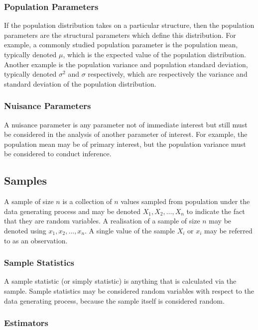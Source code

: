 \documentclass[11pt]{report} %
\begin{document}
\subsubsection{Population Parameters}

If the population distribution takes on a particular structure, then the population parameters are the structural parameters which define this distribution. For example, a commonly studied population parameter is the population mean, typically denoted $\mu$, which is the expected value of the population distribution. Another example is the population variance and population standard deviation, typically denoted $\sigma^{2}$ and $\sigma$ respectively, which are respectively the variance and standard deviation of the population distribution.

\subsubsection{Nuisance Parameters}

A nuisance parameter is any parameter not of immediate interest but still must be considered in the analysis of another parameter of interest. For example, the population mean may be of primary interest, but the population variance must be considered to conduct inference.

\subsection{Samples}

A sample of size $n$ is a collection of $n$ values sampled from population under the data generating process and may be denoted $X_{1}, X_{2}, \dots, X_{n}$ to indicate the fact that they are random variables. A realisation of a sample of size $n$ may be denoted using $x_{1}, x_{2}, \dots, x_{n}$. A single value of the sample $X_{i}$ or $x_{i}$ may be referred to as an observation.

\subsubsection{Sample Statistics}

A sample statistic (or simply statistic) is anything that is calculated via the sample. Sample statistics may be considered random variables with respect to the data generating process, because the sample itself is considered random.

\subsubsection{Estimators}
\end{document}
